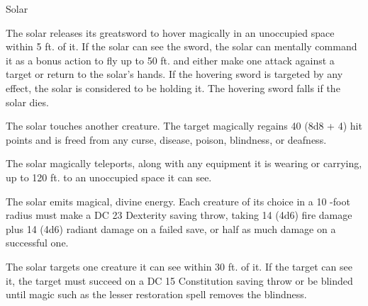 \begin{monsterbox}{Solar}
\begin{monsteraction}
\end{monsteraction}
\begin{monsteraction}
The solar releases its greatsword to hover magically in an unoccupied space within 5 ft. of it. If the solar can see the sword, the solar can mentally command it as a bonus action to fly up to 50 ft. and either make one attack against a target or return to the solar's hands. If the hovering sword is targeted by any effect, the solar is considered to be holding it. The hovering sword falls if the solar dies.
\end{monsteraction}
\begin{monsteraction}
The solar touches another creature. The target magically regains 40 (8d8 + 4) hit points and is freed from any curse, disease, poison, blindness, or deafness.
\end{monsteraction}
\begin{monsteraction}[Teleport]
The solar magically teleports, along with any equipment it is wearing or carrying, up to 120 ft. to an unoccupied space it can see.
\end{monsteraction}
\begin{monsteraction}
The solar emits magical, divine energy. Each creature of its choice in a 10 -foot radius must make a DC 23 Dexterity saving throw, taking 14 (4d6) fire damage plus 14 (4d6) radiant damage on a failed save, or half as much damage on a successful one.
\end{monsteraction}
\begin{monsteraction}
The solar targets one creature it can see within 30 ft. of it. If the target can see it, the target must succeed on a DC 15 Constitution saving throw or be blinded until magic such as the lesser restoration spell removes the blindness.
\end{monsteraction}
\end{monsterbox}